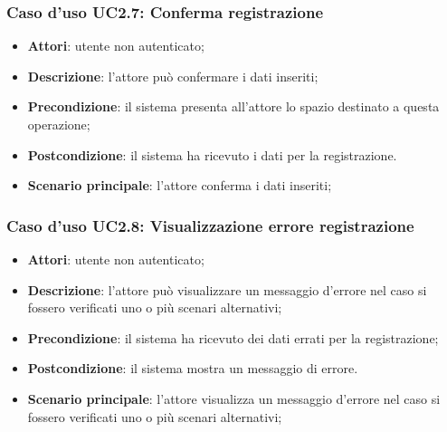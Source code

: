 \subsubsection{Caso d'uso UC2.7: Conferma registrazione}
\begin{itemize}
\item \textbf{Attori}: utente non autenticato;
\item \textbf{Descrizione}: l'attore può confermare i dati inseriti;
\item \textbf{Precondizione}: il sistema presenta all'attore lo spazio destinato a questa operazione;
\item \textbf{Postcondizione}: il sistema ha ricevuto i dati per la registrazione.
\item \textbf{Scenario principale}: l'attore conferma i dati inseriti;
\end{itemize}

\subsubsection{Caso d'uso UC2.8: Visualizzazione errore registrazione}
\begin{itemize}
\item \textbf{Attori}: utente non autenticato;
\item \textbf{Descrizione}: l'attore può visualizzare un messaggio d'errore nel caso si fossero verificati uno o più scenari alternativi;
\item \textbf{Precondizione}: il sistema ha ricevuto dei dati errati per la registrazione;
\item \textbf{Postcondizione}: il sistema mostra un messaggio di errore.
\item \textbf{Scenario principale}: l'attore visualizza un messaggio d'errore nel caso si fossero verificati uno o più scenari alternativi;
\end{itemize}
